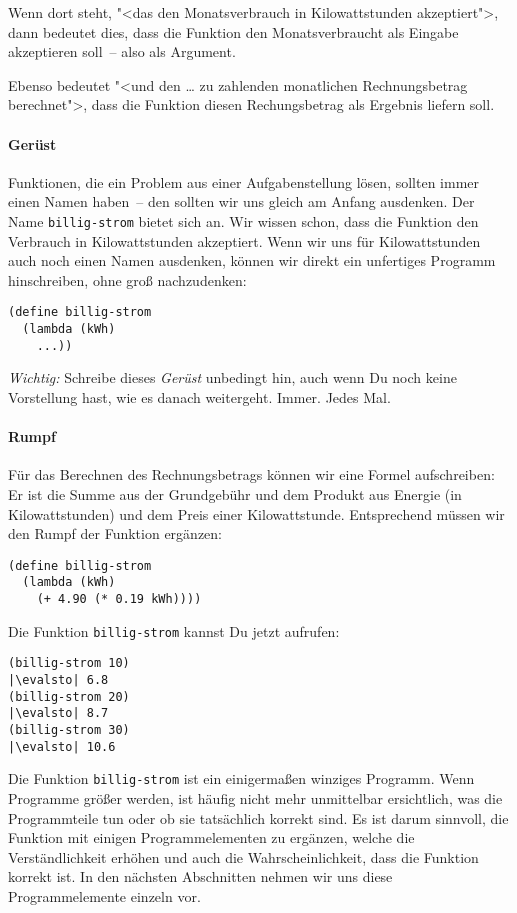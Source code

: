 Wenn dort steht, "<das den Monatsverbrauch in Kilowattstunden
akzeptiert">, dann bedeutet dies, dass die Funktion den
Monatsverbraucht als Eingabe akzeptieren soll~-- also als Argument.

Ebenso bedeutet "<und den \ldots{} zu zahlenden monatlichen
Rechnungsbetrag berechnet">, dass die Funktion diesen Rechungsbetrag
als Ergebnis liefern soll.

\paragraph{Gerüst}

Funktionen, die ein Problem aus einer Aufgabenstellung lösen, sollten immer
einen Namen haben~-- den sollten wir uns gleich am Anfang ausdenken. Der Name
\lstinline{billig-strom} bietet sich an. Wir wissen schon, dass die Funktion
den Verbrauch in Kilowattstunden akzeptiert. Wenn wir uns für Kilowattstunden
auch noch einen Namen ausdenken, können wir direkt ein unfertiges Programm
hinschreiben, ohne groß nachzudenken:
%
\begin{lstlisting}
(define billig-strom
  (lambda (kWh)
    ...))
\end{lstlisting}
%
\emph{Wichtig:} Schreibe dieses \textit{Gerüst}
unbedingt hin, auch wenn Du noch keine Vorstellung hast, wie es danach
weitergeht.  Immer.  Jedes Mal.

\paragraph{Rumpf}

Für das Berechnen des Rechnungsbetrags können wir eine Formel
aufschreiben: Er ist die Summe aus der Grundgebühr und
dem Produkt aus Energie (in Kilowattstunden) und dem Preis einer Kilowattstunde.
Entsprechend müssen wir den Rumpf der
Funktion ergänzen:
%
\begin{lstlisting}
(define billig-strom
  (lambda (kWh)
    (+ 4.90 (* 0.19 kWh))))
\end{lstlisting}
%
Die Funktion \lstinline{billig-strom} kannst Du jetzt aufrufen:
%
\begin{lstlisting}
(billig-strom 10)
|\evalsto| 6.8
(billig-strom 20)
|\evalsto| 8.7
(billig-strom 30)
|\evalsto| 10.6
\end{lstlisting}
%
Die Funktion \lstinline{billig-strom} ist ein einigermaßen winziges
Programm.  Wenn Programme größer werden, ist häufig nicht mehr
unmittelbar ersichtlich, was die Programmteile tun oder ob sie
tatsächlich korrekt sind.  Es ist darum sinnvoll, die Funktion mit
einigen Programmelementen zu ergänzen, welche die Verständlichkeit
erhöhen und auch die Wahrscheinlichkeit, dass die Funktion korrekt
ist.  In den nächsten Abschnitten nehmen wir uns diese
Programmelemente einzeln vor.

